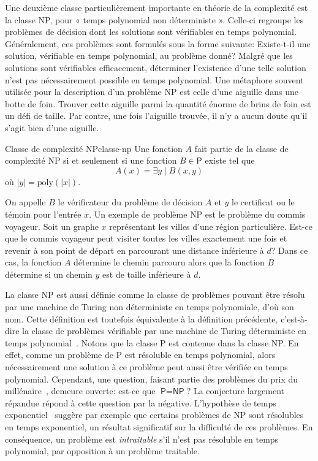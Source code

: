 Une deuxième classe particulièrement importante en théorie de la complexité est la classe \textsf{NP}, pour « temps polynomial non déterministe ». Celle-ci regroupe les problèmes de décision dont les solutions sont vérifiables en temps polynomial. Généralement, ces problèmes sont formulés sous la forme suivante: Existe-t-il une solution, vérifiable en temps polynomial, au problème donné? Malgré que les solutions sont vérifiables efficacement, déterminer l'existence d'une telle solution n'est pas nécessairement possible en temps polynomial. Une métaphore souvent utilisée pour la description d'un problème \textsf{NP} est celle d'une aiguille dans une botte de foin. Trouver cette aiguille parmi la quantité énorme de brins de foin est un défi de taille. Par contre, une fois l'aiguille trouvée, il n'y a aucun doute qu'il s'agit bien d'une aiguille. 

\begin{maindefinition}{Classe de complexité \textsf{NP}}{classe-np}
    Une fonction $A$ fait partie de la classe de complexité \textsf{NP} si et seulement si une fonction $B \in  \textsf{P}$ existe tel que
    \begin{equation*}
        A(x) = \exists y \mid B(x,y)
    \end{equation*}
    où $\lvert y \rvert = \mathrm{poly}(\lvert x \rvert)$.
\end{maindefinition}

On appelle $B$ le vérificateur du problème de décision $A$ et $y$ le certificat ou le témoin pour l'entrée $x$. Un exemple de problème \textsf{NP} est le problème du commis voyageur. Soit un graphe $x$ représentant les villes d'une région particulière. Est-ce que le commis voyageur peut visiter toutes les villes exactement une fois et revenir à son point de départ en parcourant une distance inférieure à $d$? Dans ce cas, la fonction $A$ détermine le chemin parcouru alors que la fonction $B$ détermine si un chemin $y$ est de taille inférieure à $d$.

La classe \textsf{NP} est aussi définie comme la classe de problèmes pouvant être résolu par une machine de Turing non déterministe en temps polynomiale, d'où son nom. Cette définition est toutefois équivalente à la définition précédente, c'est-à-dire la classe de problèmes vérifiable par une machine de Turing déterministe en temps polynomial~\cite{sipserIntroductionTheoryComputation2012}. Notons que la classe \textsf{P} est contenue dans la classe \textsf{NP}. En effet, comme un problème de \textsf{P} est résoluble en temps polynomial, alors nécessairement une solution à ce problème peut aussi être vérifiée en temps polynomial. Cependant, une question, faisant partie des problèmes du prix du millénaire~\cite{carlsonMillenniumPrizeProblems2006}, demeure ouverte: est-ce que $\textsf{P} = \textsf{NP}$? La conjecture largement répandue répond à cette question par la négative. L'hypothèse de temps exponentiel~\cite{impagliazzoComplexityKSAT2001} suggère par exemple que certains problèmes de \textsf{NP} sont résolubles en temps exponentiel, un résultat significatif sur la difficulté de ces problèmes. En conséquence, un problème est \textit{intraitable} s'il n'est pas résoluble en temps polynomial, par opposition à un problème traitable. 


